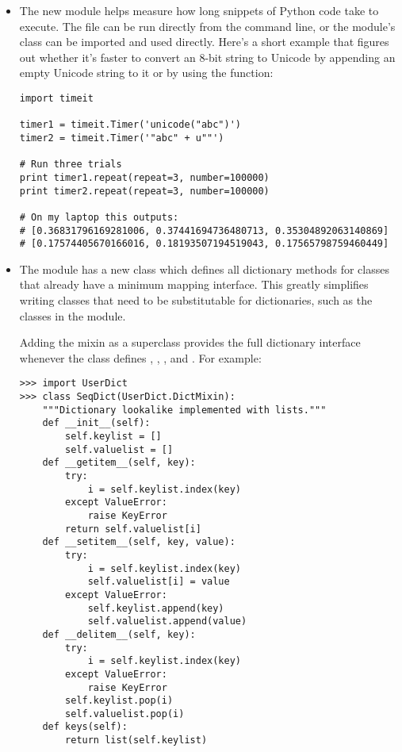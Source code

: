 \documentclass{howto}
\begin{document}
\begin{itemize}
\item The new  module helps measure how long snippets
of Python code take to execute.  The  file can be run
directly from the command line, or the module's  class
can be imported and used directly.  Here's a short example that
figures out whether it's faster to convert an 8-bit string to Unicode
by appending an empty Unicode string to it or by using the
 function:

\begin{verbatim}
import timeit

timer1 = timeit.Timer('unicode("abc")')
timer2 = timeit.Timer('"abc" + u""')

# Run three trials
print timer1.repeat(repeat=3, number=100000)
print timer2.repeat(repeat=3, number=100000)

# On my laptop this outputs:
# [0.36831796169281006, 0.37441694736480713, 0.35304892063140869]
# [0.17574405670166016, 0.18193507194519043, 0.17565798759460449]
\end{verbatim}


\item The  module has a new  class which
defines all dictionary methods for classes that already have a minimum
mapping interface.  This greatly simplifies writing classes that need
to be substitutable for dictionaries, such as the classes in 
the  module.
 
Adding the mixin as a superclass provides the full dictionary
interface whenever the class defines ,
, , and .
For example:
 
\begin{verbatim}
>>> import UserDict
>>> class SeqDict(UserDict.DictMixin):
    """Dictionary lookalike implemented with lists."""
    def __init__(self):
        self.keylist = []
        self.valuelist = []
    def __getitem__(self, key):
        try:
            i = self.keylist.index(key)
        except ValueError:
            raise KeyError
        return self.valuelist[i]
    def __setitem__(self, key, value):
        try:
            i = self.keylist.index(key)
            self.valuelist[i] = value
        except ValueError:
            self.keylist.append(key)
            self.valuelist.append(value)
    def __delitem__(self, key):
        try:
            i = self.keylist.index(key)
        except ValueError:
            raise KeyError
        self.keylist.pop(i)
        self.valuelist.pop(i)
    def keys(self):
        return list(self.keylist)


\end{verbatim}
\end{itemize}
\end{document}
